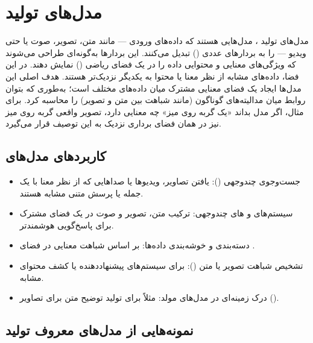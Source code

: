 \documentclass{article}
\begin{document}
\section{مدل‌های تولید }
مدل‌های تولید ، مدل‌هایی هستند که داده‌های ورودی — مانند متن، تصویر، صوت یا حتی ویدیو — را به بردارهای عددی () تبدیل می‌کنند.
این بردارها به‌گونه‌ای طراحی می‌شوند که ویژگی‌های معنایی و محتوایی داده را در یک فضای ریاضی () نمایش دهند.
در این فضا، داده‌های مشابه از نظر معنا یا محتوا به یکدیگر نزدیک‌تر هستند.
هدف اصلی این مدل‌ها ایجاد یک فضای معنایی مشترک میان داده‌های مختلف است؛
به‌طوری که بتوان روابط میان مدالیته‌های گوناگون (مانند شباهت بین متن و تصویر) را محاسبه کرد.
برای مثال، اگر مدل بداند «یک گربه روی میز» چه معنایی دارد، تصویر واقعی گربه روی میز نیز در همان فضای برداری نزدیک به این توصیف قرار می‌گیرد.
\subsection{کاربردهای مدل‌های }
\begin{itemize}
\item جست‌وجوی چندوجهی (): یافتن تصاویر، ویدیوها یا صداهایی که از نظر معنا با یک جمله یا پرسش متنی مشابه هستند.

\item سیستم‌های  و های چندوجهی: ترکیب متن، تصویر و صوت در یک فضای مشترک برای پاسخ‌گویی هوشمندتر.

\item دسته‌بندی و خوشه‌بندی داده‌ها: بر اساس شباهت معنایی در فضای .

\item تشخیص شباهت تصویر یا متن (): برای سیستم‌های پیشنهاددهنده یا کشف محتوای مشابه.

\item درک زمینه‌ای در مدل‌های مولد: مثلاً برای تولید توضیح متن برای تصاویر ().

\end{itemize}

\subsection{نمونه‌هایی از مدل‌های معروف تولید }

\end{document}
